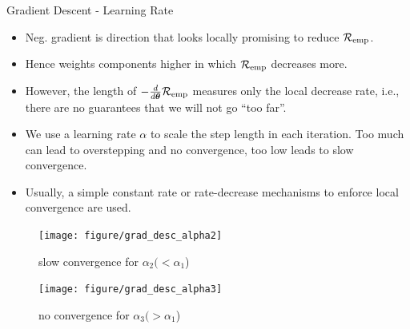 \documentclass[11pt,compress,t,notes=noshow, xcolor=table]{beamer}
\begin{document}
\begin{vbframe}{Gradient Descent - Learning Rate}
\footnotesize
\begin{itemize}
\item Neg. gradient is direction that looks locally promising to reduce $\mathcal{R}_{\text{emp}}$. \\
\item Hence weights components higher
    in which $\mathcal{R}_{\text{emp}}$ decreases more. \\
\item However, the length of $-\frac{d}{d\bm{\theta}}{\mathcal{R}_{\text{emp}}}$ measures only the local decrease rate, i.e., there are no guarantees that we will not go ``too far''. \\
\item We use a learning rate $\alpha$ to scale the step length in each iteration. Too much can lead to overstepping and no convergence, too low leads to slow convergence.
\item Usually, a simple constant rate or rate-decrease mechanisms to enforce local convergence are used.
\vspace{-2em}
\end{itemize}
\begin{figure}[!htb]
{
  \texttt{[image: figure/grad\_desc\_alpha2]}
  \caption*{\tiny slow convergence for $\alpha_2 (< \alpha_1$)}
}
{
  \texttt{[image: figure/grad\_desc\_alpha3]}
  \caption*{\tiny no convergence for $\alpha_3 (> \alpha_1$)}
}
\end{figure}

\end{vbframe}
\end{document}
